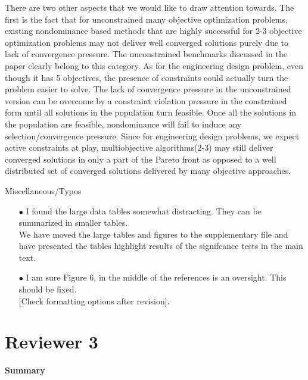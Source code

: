 \documentclass[onecolumn,10pt]{asme2ej}
\begin{document}
\begin{itemize}
{There are two other aspects that we would like to draw attention towards. The first is the fact that for unconstrained many objective optimization problems, existing nondominance based methods that are highly successful for 2-3 objective optimization problems may not deliver well converged solutions purely due to lack of convergence pressure. The unconstrained benchmarks discussed in the paper clearly belong to this category. As for the engineering design problem, even though it has 5 objectives, the presence of constraints could actually turn the problem easier to solve. The lack of convergence pressure in the unconstrained version can be overcome by a constraint violation pressure in the constrained form until all solutions in the population turn feasible. Once all the solutions in the population are feasible, nondominance will fail to induce any selection/convergence pressure. Since for engineering design problems, we expect active constraints at play, multiobjective algorithms(2-3) may still deliver converged solutions in only a part of the Pareto front as opposed to a well distributed set of converged solutions delivered by many objective approaches.



}
\end{itemize}

Miscellaneous/Typos
\begin{itemize}
\item[$\bullet$]	I found the large data tables somewhat distracting. They can be summarized in smaller tables. \\

{\color{blue} We have moved the large tables and figures to the supplementary file and have presented the tables highlight results of the signifcance tests in the main text.}\\

\item[$\bullet$]	I am sure Figure 6, in the middle of the references is an oversight. This should be fixed.\\

{\color{red} [Check formatting options after revision].}\\
\end{itemize}

\section*{Reviewer 3}

\textbf{Summary}
\end{document}
